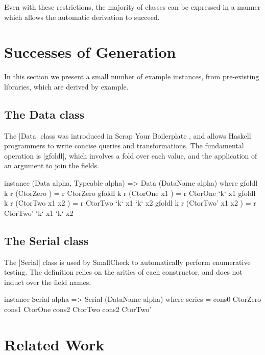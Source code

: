 \documentclass{llncs}
\begin{document}
Even with these restrictions, the majority of classes can be expressed in a manner which allows the automatic derivation to succeed.

\section{Successes of Generation}
\label{sec:automatic_success}

In this section we present a small number of example instances, from pre-existing libraries, which are derived by example.

\subsection{The Data class}

The |Data| class was introduced in Scrap Your Boilerplate \cite{lammel:syb}, and allows Haskell programmers to write concise queries and transformations. The fundamental operation is |gfoldl|, which involves a fold over each value, and the application of an argument to join the fields.

\begin{code}
instance (Data alpha, Typeable alpha) => Data (DataName alpha) where
    gfoldl k r (CtorZero         ) = r CtorZero
    gfoldl k r (CtorOne   x1     ) = r CtorOne   `k` x1
    gfoldl k r (CtorTwo   x1 x2  ) = r CtorTwo   `k` x1 `k` x2
    gfoldl k r (CtorTwo'  x1 x2  ) = r CtorTwo'  `k` x1 `k` x2
\end{code}

\subsection{The Serial class}

The |Serial| class is used by SmallCheck \cite{smallcheck} to automatically perform enumerative testing. The definition relies on the arities of each constructor, and does not induct over the field names.

\begin{code}
instance Serial alpha => Serial (DataName alpha) where
    series = cons0 CtorZero \/ cons1 CtorOne  \/ cons2 CtorTwo  \/ cons2 CtorTwo'
\end{code}

\section{Related Work}
\label{sec:related}
\end{document}
